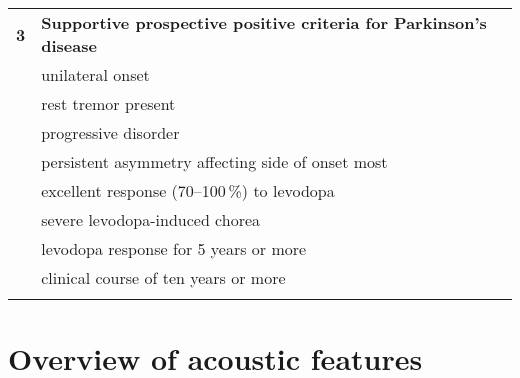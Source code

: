 \begin{table*}[htb!]
\begin{tabular}{l l}
		\noalign{\smallskip}\hline\noalign{\smallskip}
		\textbf{3} & \textbf{Supportive prospective positive criteria for Parkinson's disease} \\
		  & unilateral onset \\
		  & rest tremor present \\
		  & progressive disorder \\
		  & persistent asymmetry affecting side of onset most \\
		  & excellent response (70--100\,\%) to levodopa \\
		  & severe levodopa-induced chorea \\
		  & levodopa response for 5 years or more \\
		  & clinical course of ten years or more \\
		\noalign{\smallskip}\hline\hline
	\end{tabular}
\end{table*}

\newpage

\section{Overview of acoustic features}

